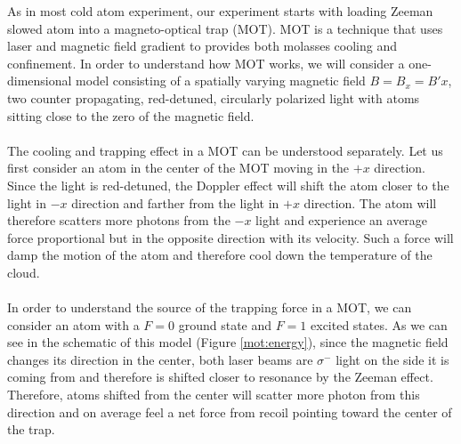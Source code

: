 As in most cold atom experiment, our experiment starts with loading Zeeman slowed atom into a magneto-optical trap (MOT). MOT is a technique that uses laser and magnetic field gradient to provides both molasses cooling and confinement. In order to understand how MOT works, we will consider a one-dimensional model consisting of a spatially varying magnetic field $B=B_x=B'x$, two counter propagating, red-detuned, circularly polarized light with atoms sitting close to the zero of the magnetic field.\\
\\
The cooling and trapping effect in a MOT can be understood separately. Let us first consider an atom in the center of the MOT moving in the $+x$ direction. Since the light is red-detuned, the Doppler effect will shift the atom closer to the light in $-x$ direction and farther from the light in $+x$ direction. The atom will therefore scatters more photons from the $-x$ light and experience an average force proportional but in the opposite direction with its velocity. Such a force will damp the motion of the atom and therefore cool down the temperature of the cloud.\\
\\
In order to understand the source of the trapping force in a MOT, we can consider an atom with a $F=0$ ground state and $F=1$ excited states. As we can see in the schematic of this model (Figure \ref{mot:energy}), since the magnetic field changes its direction in the center, both laser beams are $\sigma^-$ light on the side it is coming from and therefore is shifted closer to resonance by the Zeeman effect. Therefore, atoms shifted from the center will scatter more photon from this direction and on average feel a net force from recoil pointing toward the center of the trap.\\

